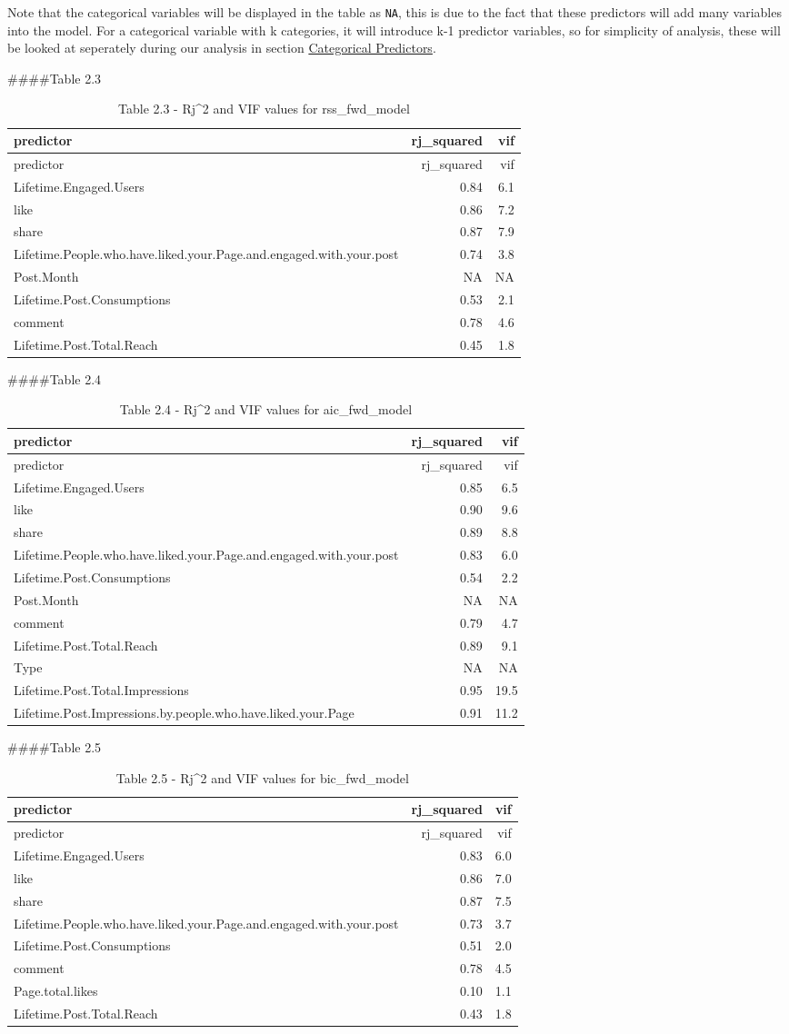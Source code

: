 \documentclass[
]{article}
\begin{document}
Note that the categorical variables will be displayed in the table as
\texttt{NA}, this is due to the fact that these predictors will add many
variables into the model. For a categorical variable with k categories,
it will introduce k-1 predictor variables, so for simplicity of
analysis, these will be looked at seperately during our analysis in
section \protect\hyperlink{categorical-predictors}{Categorical
Predictors}.

\#\#\#\#Table 2.3

\begin{longtable}[]{@{}lrr@{}}
\caption{Table 2.3 - Rj\^{}2 and VIF values for
rss\_fwd\_model}\tabularnewline
\toprule
predictor & rj\_squared & vif\tabularnewline
\midrule
\endfirsthead
\toprule
predictor & rj\_squared & vif\tabularnewline
\midrule
\endhead
Lifetime.Engaged.Users & 0.84 & 6.1\tabularnewline
like & 0.86 & 7.2\tabularnewline
share & 0.87 & 7.9\tabularnewline
Lifetime.People.who.have.liked.your.Page.and.engaged.with.your.post &
0.74 & 3.8\tabularnewline
Post.Month & NA & NA\tabularnewline
Lifetime.Post.Consumptions & 0.53 & 2.1\tabularnewline
comment & 0.78 & 4.6\tabularnewline
Lifetime.Post.Total.Reach & 0.45 & 1.8\tabularnewline
\bottomrule
\end{longtable}

\#\#\#\#Table 2.4

\begin{longtable}[]{@{}lrr@{}}
\caption{Table 2.4 - Rj\^{}2 and VIF values for
aic\_fwd\_model}\tabularnewline
\toprule
predictor & rj\_squared & vif\tabularnewline
\midrule
\endfirsthead
\toprule
predictor & rj\_squared & vif\tabularnewline
\midrule
\endhead
Lifetime.Engaged.Users & 0.85 & 6.5\tabularnewline
like & 0.90 & 9.6\tabularnewline
share & 0.89 & 8.8\tabularnewline
Lifetime.People.who.have.liked.your.Page.and.engaged.with.your.post &
0.83 & 6.0\tabularnewline
Lifetime.Post.Consumptions & 0.54 & 2.2\tabularnewline
Post.Month & NA & NA\tabularnewline
comment & 0.79 & 4.7\tabularnewline
Lifetime.Post.Total.Reach & 0.89 & 9.1\tabularnewline
Type & NA & NA\tabularnewline
Lifetime.Post.Total.Impressions & 0.95 & 19.5\tabularnewline
Lifetime.Post.Impressions.by.people.who.have.liked.your.Page & 0.91 &
11.2\tabularnewline
\bottomrule
\end{longtable}

\#\#\#\#Table 2.5

\begin{longtable}[]{@{}lrr@{}}
\caption{Table 2.5 - Rj\^{}2 and VIF values for
bic\_fwd\_model}\tabularnewline
\toprule
predictor & rj\_squared & vif\tabularnewline
\midrule
\endfirsthead
\toprule
predictor & rj\_squared & vif\tabularnewline
\midrule
\endhead
Lifetime.Engaged.Users & 0.83 & 6.0\tabularnewline
like & 0.86 & 7.0\tabularnewline
share & 0.87 & 7.5\tabularnewline
Lifetime.People.who.have.liked.your.Page.and.engaged.with.your.post &
0.73 & 3.7\tabularnewline
Lifetime.Post.Consumptions & 0.51 & 2.0\tabularnewline
comment & 0.78 & 4.5\tabularnewline
Page.total.likes & 0.10 & 1.1\tabularnewline
Lifetime.Post.Total.Reach & 0.43 & 1.8\tabularnewline
\bottomrule
\end{longtable}
\end{document}
